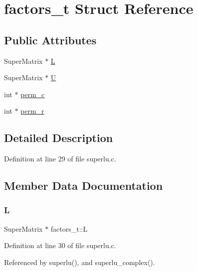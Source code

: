 \hypertarget{structfactors__t}{}\section{factors\+\_\+t Struct Reference}
\label{structfactors__t}
\subsection*{Public Attributes}
\begin{DoxyCompactItemize}
\item 
Super\+Matrix $\ast$ \hyperlink{structfactors__t_a17d4587aa0c7b0e0e39300d4087d4131}{L}
\item 
Super\+Matrix $\ast$ \hyperlink{structfactors__t_a336bf3fd72304c337b78e71607de7d1e}{U}
\item 
int $\ast$ \hyperlink{structfactors__t_af26c51d6a48540340d440ff1c20a28cc}{perm\+\_\+c}
\item 
int $\ast$ \hyperlink{structfactors__t_af0016e789d7a575ffc8945a23b3b812a}{perm\+\_\+r}
\end{DoxyCompactItemize}


\subsection{Detailed Description}


Definition at line 29 of file superlu.\+c.



\subsection{Member Data Documentation}
\mbox{\label{structfactors__t_a17d4587aa0c7b0e0e39300d4087d4131}} 
\subsubsection{\texorpdfstring{L}{L}}
{\footnotesize\ttfamily Super\+Matrix $\ast$ factors\+\_\+t\+::L}



Definition at line 30 of file superlu.\+c.



Referenced by superlu(), and superlu\+\_\+complex().

\mbox{\label{structfactors__t_af26c51d6a48540340d440ff1c20a28cc}} 
